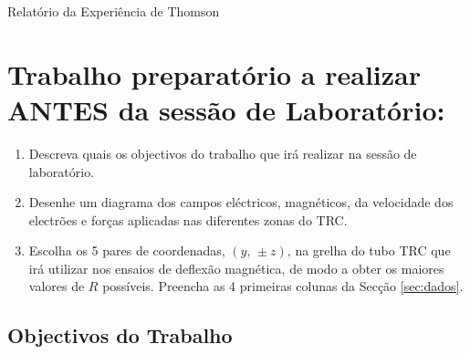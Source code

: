 \documentclass[a4paper,12pt]{article}  %
\author{Prof. Bernardo B. Carvalho}
\date{ Outubro 2015}
\newcommand{\HRule}{\rule{\linewidth}{0.5mm}}
\begin{document}
 



{  \sf  Relatório da Experiência de Thomson} %




\section{\sf Trabalho preparatório a realizar ANTES da sessão de Laboratório:}
\begin{enumerate}
\item Descreva quais os objectivos do trabalho que irá realizar na sessão de laboratório. 
\item Desenhe um diagrama dos campos eléctricos, magnéticos, da velocidade dos electrões e forças aplicadas nas diferentes zonas do TRC.
\item Escolha os 5 pares de coordenadas, $(y,\, \pm z)$, na grelha do tubo TRC que irá utilizar nos ensaios de deflexão magnética, de modo a obter os maiores valores  de $R$ possíveis. Preencha as 4 primeiras colunas da Secção \ref{sec:dados}.
\end{enumerate}

\subsection{\sf Objectivos do Trabalho}
\noindent\underline{\makebox[\textwidth][r]{~}} \\
\noindent\underline{\makebox[\textwidth][r]{~}} \\
\noindent\underline{\makebox[\textwidth][r]{~}} \\
\noindent\underline{\makebox[\textwidth][r]{~}} \\
\noindent\underline{\makebox[\textwidth][r]{~}} \\
\noindent\underline{\makebox[\textwidth][r]{~}} \\
\noindent\underline{\makebox[\textwidth][r]{~}} \\
\end{document}
